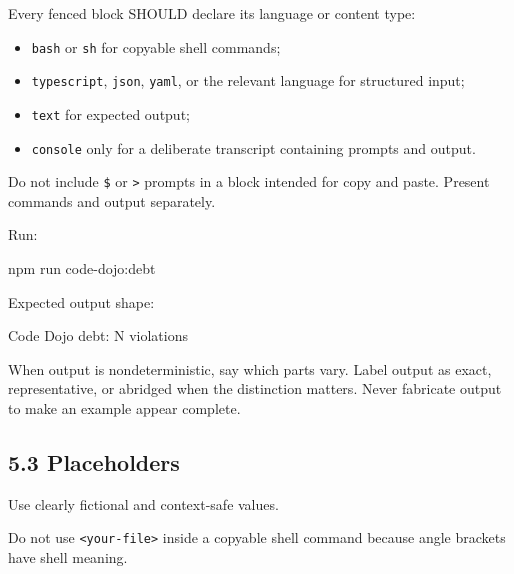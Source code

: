 Every fenced block SHOULD declare its language or content type:

\begin{itemize}
\tightlist
\item
  \texttt{b\allowbreak{}a\allowbreak{}s\allowbreak{}h} or \texttt{s\allowbreak{}h} for copyable shell commands;
\item
  \texttt{t\allowbreak{}y\allowbreak{}p\allowbreak{}e\allowbreak{}s\allowbreak{}c\allowbreak{}r\allowbreak{}i\allowbreak{}p\allowbreak{}t}, \texttt{j\allowbreak{}s\allowbreak{}o\allowbreak{}n}, \texttt{y\allowbreak{}a\allowbreak{}m\allowbreak{}l}, or the relevant language for structured input;
\item
  \texttt{t\allowbreak{}e\allowbreak{}x\allowbreak{}t} for expected output;
\item
  \texttt{c\allowbreak{}o\allowbreak{}n\allowbreak{}s\allowbreak{}o\allowbreak{}l\allowbreak{}e} only for a deliberate transcript containing prompts and output.
\end{itemize}

Do not include \texttt{\$} or \texttt{>} prompts in a block intended for copy and paste. Present commands and output separately.

Run:

\begin{CodeBlock}
npm run code-dojo:debt
\end{CodeBlock}

Expected output shape:

\begin{CodeBlock}
Code Dojo debt: N violations
\end{CodeBlock}

When output is nondeterministic, say which parts vary. Label output as exact, representative, or abridged when the distinction matters. Never fabricate output to make an example appear complete.

\subsection{5.3 Placeholders}\label{record-005-placeholders}

Use clearly fictional and context-safe values.



Do not use \texttt{<\allowbreak{}y\allowbreak{}o\allowbreak{}u\allowbreak{}r\allowbreak{}-\allowbreak{}f\allowbreak{}i\allowbreak{}l\allowbreak{}e\allowbreak{}>} inside a copyable shell command because angle brackets have shell meaning.

